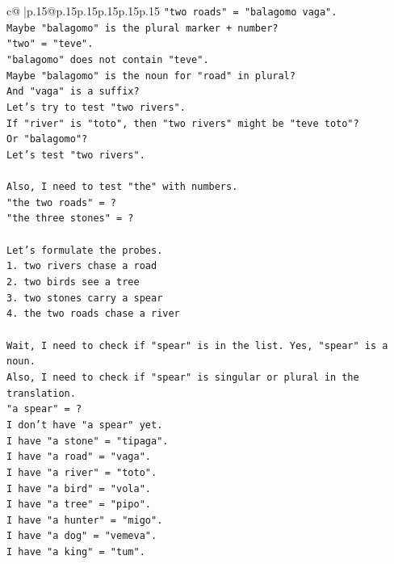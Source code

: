 \documentclass{article}
\begin{document}
{\begin{supertabular}{c@{$\;$}|p{.15\linewidth}@{}p{.15\linewidth}p{.15\linewidth}p{.15\linewidth}p{.15\linewidth}p{.15\linewidth}}
{{{\texttt{"two roads" = "balagomo vaga".} \\
\texttt{Maybe "balagomo" is the plural marker + number?} \\
\texttt{"two" = "teve".} \\
\texttt{"balagomo" does not contain "teve".} \\
\texttt{Maybe "balagomo" is the noun for "road" in plural?} \\
\texttt{And "vaga" is a suffix?} \\
\texttt{Let's try to test "two rivers".} \\
\texttt{If "river" is "toto", then "two rivers" might be "teve toto"?} \\
\texttt{Or "balagomo"?} \\
\texttt{Let's test "two rivers".} \\
\\ 
\texttt{Also, I need to test "the" with numbers.} \\
\texttt{"the two roads" = ?} \\
\texttt{"the three stones" = ?} \\
\\ 
\texttt{Let's formulate the probes.} \\
\texttt{1. two rivers chase a road} \\
\texttt{2. two birds see a tree} \\
\texttt{3. two stones carry a spear} \\
\texttt{4. the two roads chase a river} \\
\\ 
\texttt{Wait, I need to check if "spear" is in the list. Yes, "spear" is a noun.} \\
\texttt{Also, I need to check if "spear" is singular or plural in the translation.} \\
\texttt{"a spear" = ?} \\
\texttt{I don't have "a spear" yet.} \\
\texttt{I have "a stone" = "tipaga".} \\
\texttt{I have "a road" = "vaga".} \\
\texttt{I have "a river" = "toto".} \\
\texttt{I have "a bird" = "vola".} \\
\texttt{I have "a tree" = "pipo".} \\
\texttt{I have "a hunter" = "migo".} \\
\texttt{I have "a dog" = "vemeva".} \\
\texttt{I have "a king" = "tum".} \\
}}}
\end{supertabular}}
\end{document}
